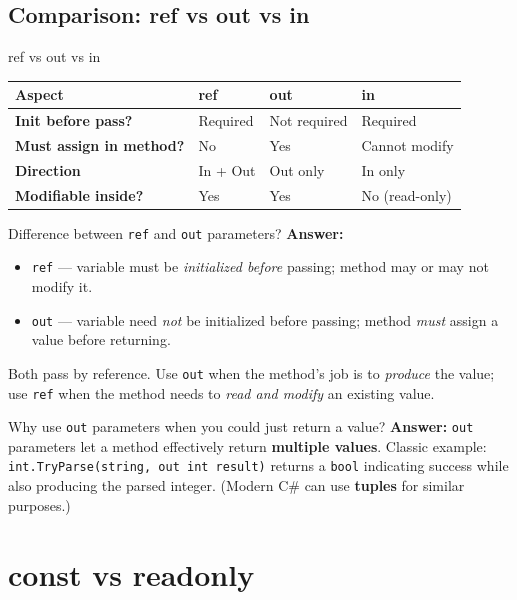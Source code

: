 \documentclass[11pt,a4paper]{article}
\newcommand{\rowcolortop}{\rowcolor{tableHead}\color{white}\bfseries}
\newcommand{\rowcolorlight}{\rowcolor{tableAlt}}
\begin{document}
\subsection{Comparison: ref vs out vs in}

\begin{compareBox}{ref vs out vs in}
\begin{tabularx}{\linewidth}{|>{\bfseries}p{2.5cm}|X|X|X|}
\hline
\rowcolortop \color{white}Aspect & \color{white}ref & \color{white}out & \color{white}in \\
\hline
Init before pass? & Required & Not required & Required \\
\rowcolorlight
Must assign in method? & No & Yes & Cannot modify \\
Direction & In + Out & Out only & In only \\
\rowcolorlight
Modifiable inside? & Yes & Yes & No (read-only) \\
\hline
\end{tabularx}
\end{compareBox}

\begin{intqBox}{Difference between \texttt{ref} and \texttt{out} parameters?}
\textbf{Answer:}
\begin{itemize}[leftmargin=*]
    \item \texttt{ref} — variable must be \textit{initialized before} passing; method may or may not modify it.
    \item \texttt{out} — variable need \textit{not} be initialized before passing; method \textit{must} assign a value before returning.
\end{itemize}
Both pass by reference. Use \texttt{out} when the method's job is to \textit{produce} the value; use \texttt{ref} when the method needs to \textit{read and modify} an existing value.
\end{intqBox}

\begin{intqBox}{Why use \texttt{out} parameters when you could just return a value?}
\textbf{Answer:} \texttt{out} parameters let a method effectively return \textbf{multiple values}. Classic example: \texttt{int.TryParse(string, out int result)} returns a \texttt{bool} indicating success while also producing the parsed integer. (Modern C\# can use \textbf{tuples} for similar purposes.)
\end{intqBox}

\clearpage
\section{const vs readonly}
\end{document}
